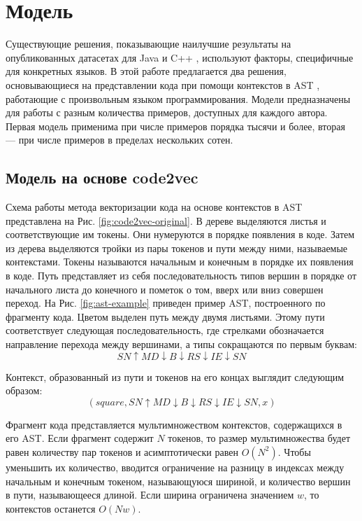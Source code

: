\section{Модель}\label{sec:model}

Существующие решения, показывающие наилучшие результаты на опубликованных датасетах для Java \cite{Yang2017} и C++ \cite{Caliskan2015}, используют факторы, специфичные для конкретных языков. В этой работе предлагается два решения, основывающиеся на представлении кода при помощи контекстов в AST \cite{Alon2018}, работающие с произвольным языком программирования. Модели предназначены для работы с разным количества примеров, доступных для каждого автора. Первая модель применима при числе примеров порядка тысячи и более, вторая — при числе примеров в пределах нескольких сотен.

\subsection{Модель на основе code2vec}

Схема работы метода векторизации кода на основе контекстов в AST представлена на Рис. \ref{fig:code2vec-original}. В дереве выделяются листья и соответствующие им токены. Они нумеруются в порядке появления в коде. Затем из дерева выделяются тройки из пары токенов и пути между ними, называемые контекстами. Токены называются начальным и конечным в порядке их появления в коде. Путь представляет из себя последовательность типов вершин в порядке от начального листа до конечного и пометок о том, вверх или вниз совершен переход. На Рис. \ref{fig:ast-example} приведен пример AST, построенного по фрагменту кода. Цветом выделен путь между двумя листьями. Этому пути соответствует следующая последовательность, где стрелками обозначается направление перехода между вершинами, а типы сокращаются по первым буквам:
$$SN \uparrow MD \downarrow B \downarrow RS \downarrow IE \downarrow SN$$

Контекст, образованный из пути и токенов на его концах выглядит следующим образом:
$$(square, SN \uparrow MD \downarrow B \downarrow RS \downarrow IE \downarrow SN, x)$$

Фрагмент кода представляется мультимножеством контекстов, содержащихся в его AST. Если фрагмент содержит $N$ токенов, то размер мультимножества будет равен количеству пар токенов и асимптотически равен $O(N^2)$. Чтобы уменьшить их количество, вводится ограничение на разницу в индексах между начальным и конечным токеном, называющуюся шириной, и количество вершин в пути, называющееся длиной. Если ширина ограничена значением $w$, то контекстов останется $O(Nw)$.


